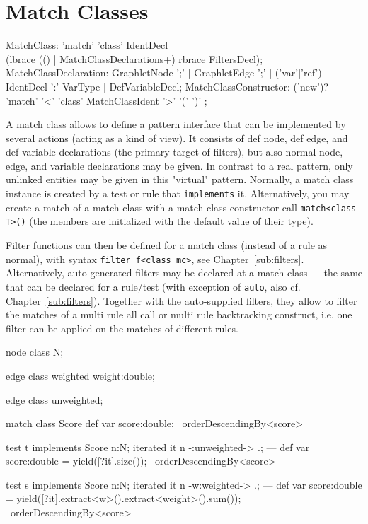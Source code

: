 \section{Match Classes}\label{sec:matchclass}

\begin{rail}
  MatchClass: 'match' 'class' IdentDecl \\
    (lbrace (() | MatchClassDeclarations+) rbrace FiltersDecl);
  MatchClassDeclaration: GraphletNode ';' 
	| GraphletEdge ';' 
	| ('var'|'ref') IdentDecl ':' VarType
	| DefVariableDecl;
  MatchClassConstructor: ('new')? 'match' '<' 'class' MatchClassIdent '>' '(' ')' ;
\end{rail}

A match class allows to define a pattern interface that can be implemented by several actions (acting as a kind of view).
It consists of def node, def edge, and def variable declarations (the primary target of filters), but also normal node, edge, and variable declarations may be given.
In contrast to a real pattern, only unlinked entities may be given in this "virtual" pattern.
Normally, a match class instance is created by a test or rule that \texttt{implements} it.
Alternatively, you may create a match of a match class with a match class constructor call
\texttt{match<class T>()} (the members are initialized with the default value of their type).

Filter functions can then be defined for a match class (instead of a rule as normal), with syntax \texttt{filter f<class mc>}, see Chapter~\ref{sub:filters}.
Alternatively, auto-generated filters may be declared at a match class --- the same that can be declared for a rule/test (with exception of \texttt{auto}, also cf. Chapter~\ref{sub:filters}).
Together with the auto-supplied filters, they allow to filter the matches of a multi rule all call or multi rule backtracking construct, i.e. one filter can be applied on the matches of different rules.

\begin{example}
  \begin{grgen}
node class N;

edge class weighted
{
	weight:double;
}

edge class unweighted;
  \end{grgen}

  \begin{grgen}
match class Score
{
	def var score:double;
} \ orderDescendingBy<score>

test t implements Score
{
	n:N;
	iterated it {
		n -:unweighted-> .;
	}
---	
	def var score:double = yield([?it].size());
} \ orderDescendingBy<score>

test s implements Score
{
	n:N;
	iterated it {
		n -w:weighted-> .;		
	}
---	
	def var score:double = yield([?it].extract<w>().extract<weight>().sum());
} \ orderDescendingBy<score>
  \end{grgen}\label{exmatchclass}
\end{example}


